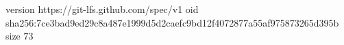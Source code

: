 version https://git-lfs.github.com/spec/v1
oid sha256:7ce3bad9ed29c8a487e1999d5d2caefc9bd12f4072877a55af975873265d395b
size 73
